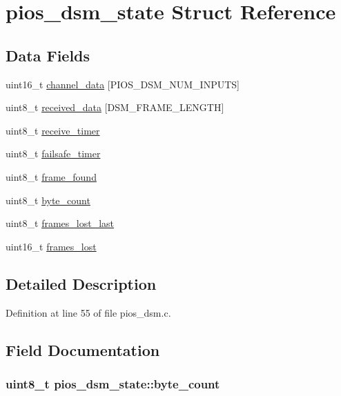\hypertarget{structpios__dsm__state}{\section{pios\-\_\-dsm\-\_\-state \-Struct \-Reference}
\label{structpios__dsm__state}
}
\subsection*{\-Data \-Fields}
\begin{DoxyCompactItemize}
\item 
uint16\-\_\-t \hyperlink{structpios__dsm__state_aade4ea4a4eb46a6e63db80e6f4c55b11}{channel\-\_\-data} \mbox{[}\-P\-I\-O\-S\-\_\-\-D\-S\-M\-\_\-\-N\-U\-M\-\_\-\-I\-N\-P\-U\-T\-S\mbox{]}
\item 
uint8\-\_\-t \hyperlink{structpios__dsm__state_af4caef811fdc9b8381bedc715e92068e}{received\-\_\-data} \mbox{[}\-D\-S\-M\-\_\-\-F\-R\-A\-M\-E\-\_\-\-L\-E\-N\-G\-T\-H\mbox{]}
\item 
uint8\-\_\-t \hyperlink{structpios__dsm__state_af7296b9f7aa4be7e56a8edd0025c5fab}{receive\-\_\-timer}
\item 
uint8\-\_\-t \hyperlink{structpios__dsm__state_a70f387f5d5e82231a14003705b43fb59}{failsafe\-\_\-timer}
\item 
uint8\-\_\-t \hyperlink{structpios__dsm__state_a6d1e951d9c03ec9651104491b4ad9b1a}{frame\-\_\-found}
\item 
uint8\-\_\-t \hyperlink{structpios__dsm__state_ad73722b14672f205b7bfd9ebdac3b53a}{byte\-\_\-count}
\item 
uint8\-\_\-t \hyperlink{structpios__dsm__state_a427f6b8b7743f180403285623f71260e}{frames\-\_\-lost\-\_\-last}
\item 
uint16\-\_\-t \hyperlink{structpios__dsm__state_ae3dfacd2e0da0bc8b4503054f854bfcc}{frames\-\_\-lost}
\end{DoxyCompactItemize}


\subsection{\-Detailed \-Description}


\-Definition at line 55 of file pios\-\_\-dsm.\-c.



\subsection{\-Field \-Documentation}
\hypertarget{structpios__dsm__state_ad73722b14672f205b7bfd9ebdac3b53a}{
\subsubsection[{byte\-\_\-count}]{\setlength{\rightskip}{0pt plus 5cm}uint8\-\_\-t {\bf pios\-\_\-dsm\-\_\-state\-::byte\-\_\-count}}}\label{structpios__dsm__state_ad73722b14672f205b7bfd9ebdac3b53a}


